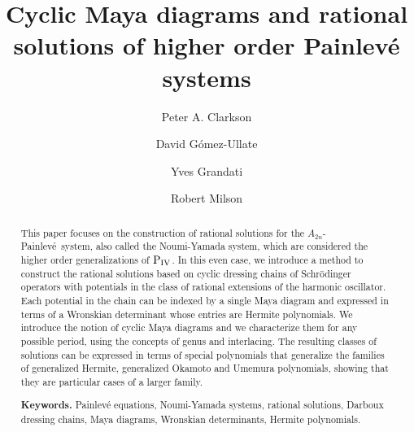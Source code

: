 \documentclass[10pt]{amsart}
\theoremstyle{definition}
\numberwithin{equation}{section}
\numberwithin{figure}{section}
\newcommand{\Pfour}{{\rm P_{IV}}}
\newcommand{\Pfive}{{\rm P_{V}}}
\newcommand{\p}{Painlev\'{e}}
\begin{document}
\title[Cyclic Maya diagrams]{Cyclic Maya diagrams and rational solutions of higher order Painlev\'{e} systems}

\author{Peter A. Clarkson}
\address{School of Mathematics, Statistics and Actuarial Science,
University of Kent, CT2 7NF, UK.}


\author{David G\'omez-Ullate}
\address{Escuela Superior de Ingenier\'ia, Universidad de C\'adiz, 11519 Puerto Real, Spain.}
\address{Departamento de F\'isica Te\'orica, Universidad Complutense de
  Madrid, 28040 Madrid, Spain.}

\author{Yves Grandati}
\address{ Laboratoire de Physique et Chimie Th\'eoriques, Universit\'e de Lorraine, 57078 Metz, Cedex 3, France.}
\author{Robert Milson}
\address{Department of Mathematics and Statistics, Dalhousie University,
  Halifax, NS, B3H 3J5, Canada.}
\begin{abstract}
This paper focuses on the construction of rational solutions for the $A_{2n}$-\p\ system, also called the Noumi-Yamada system, which are considered the higher order generalizations of $\Pfour$. In this even case, we introduce a method to construct the rational solutions based on cyclic dressing chains of Schr\"{o}dinger operators with potentials in the class of rational extensions of the harmonic oscillator. Each potential in the chain can be indexed by a single Maya diagram and expressed in terms of a Wronskian determinant whose entries are Hermite polynomials. We introduce the notion of cyclic Maya diagrams and we characterize them for any possible period, using the concepts of genus and interlacing. The resulting classes of solutions can be expressed in terms of special polynomials that generalize the families of generalized Hermite, generalized Okamoto and Umemura polynomials, showing that they are particular cases of a larger family.

\bigskip
\noindent \textbf{Keywords.} Painlev\'e equations, Noumi-Yamada systems, rational solutions, Darboux dressing chains, Maya diagrams, Wronskian determinants, Hermite polynomials.
\end{abstract}
\end{document}
